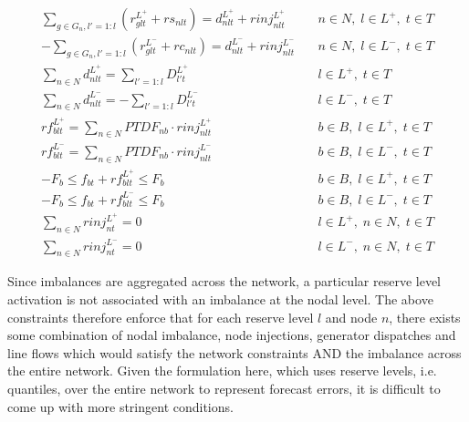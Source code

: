 \documentclass[number,times]{elsarticle}
\begin{document}
\begin{align}
    \sum_{g \in G_n, l'=1:l} (r^{L^+}_{glt} + rs_{nlt}) = d^{L^+}_{nlt} + rinj^{L^+}_{nlt} & \quad n \in N, \; l \in L^+, \; t \in T \\
    - \sum_{g \in G_n, l'=1:l} (r^{L^-}_{glt} + rc_{nlt}) = d^{L^-}_{nlt} + rinj^{L^-}_{nlt} & \quad n \in N, \; l \in L^-, \; t \in T \\
    \sum_{n \in N} d^{L^+}_{nlt} = \sum_{l'=1:l} D^{L^+}_{l't}                             & \quad l \in L^+, \; t \in T             \\
    \sum_{n \in N} d^{L^-}_{nlt} = - \sum_{l'=1:l} D^{L^-}_{l't}                            & \quad l \in L^-, \; t \in T             \\
    rf^{L^+}_{blt} = \sum_{n \in N} PTDF_{nb} \cdot rinj^{L^+}_{nlt}                       & \quad b \in B, \; l \in L^+, \; t \in T \\
    rf^{L^-}_{blt} = \sum_{n \in N} PTDF_{nb} \cdot rinj^{L^-}_{nlt}                       & \quad b \in B, \; l \in L^-, \; t \in T \\
    -F_{b} \leq f_{bt} + rf^{L^+}_{blt} \leq F_b                                           & \quad b \in B, \; l \in L^+, \; t \in T \\
    -F_{b} \leq f_{bt} + rf^{L^-}_{blt} \leq F_b                                           & \quad b \in B, \; l \in L^-, \; t \in T \\
    \sum_{n \in N} rinj^{L^+}_{nt} = 0                                                     & \quad l \in L^+, \; n \in N, \; t \in T \\
    \sum_{n \in N} rinj^{L^-}_{nt} = 0                                                     & \quad l \in L^-, \; n \in N, \; t \in T
\end{align}

Since imbalances are aggregated across the network, a particular reserve level activation is not associated with an imbalance at the nodal level. The above constraints therefore enforce that for each reserve level $l$ and node $n$, there exists some combination of nodal imbalance, node injections, generator dispatches and line flows which would satisfy the network constraints AND the imbalance across the entire network. Given the formulation here, which uses reserve levels, i.e. quantiles, over the entire network to represent forecast errors, it is difficult to come up with more stringent conditions.
\end{document}
